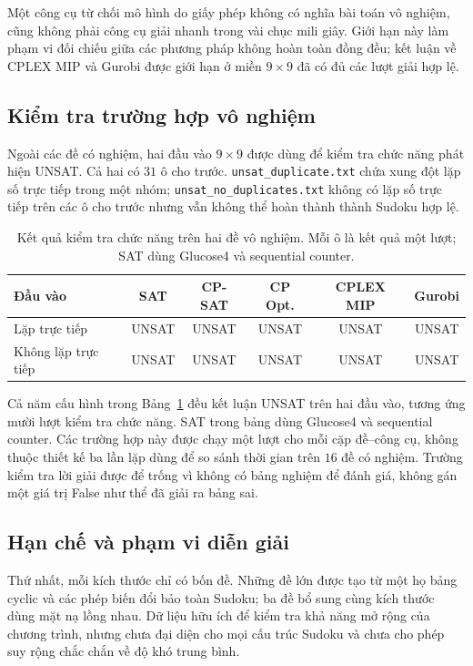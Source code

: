\documentclass[a4paper,fleqn]{cas-sc}
\begin{document}
Một công cụ từ chối mô hình do giấy phép không có nghĩa bài toán vô
nghiệm, cũng không phải công cụ giải nhanh trong vài chục mili giây.
Giới hạn này làm phạm vi đối chiếu giữa các phương pháp không hoàn
toàn đồng đều; kết luận về CPLEX MIP và Gurobi được giới hạn ở miền
$9\times9$ đã có đủ các lượt giải hợp lệ.

\subsection{Kiểm tra trường hợp vô nghiệm}

Ngoài các đề có nghiệm, hai đầu vào $9\times9$ được dùng để kiểm tra
chức năng phát hiện UNSAT. Cả hai có $31$ ô cho trước.
\texttt{unsat\_duplicate.txt} chứa xung đột lặp số trực tiếp trong một
nhóm; \texttt{unsat\_no\_duplicates.txt} không có lặp số trực tiếp
trên các ô cho trước nhưng vẫn không thể hoàn thành thành Sudoku hợp lệ.

\begin{table}[pos=htbp]
 \centering
 \caption{Kết quả kiểm tra chức năng trên hai đề vô nghiệm. Mỗi ô là kết quả một lượt; SAT dùng Glucose4 và sequential counter.}
 \label{tab:exp-unsat}
 \begin{tabular}{lccccc}
  \toprule
  Đầu vào & SAT & CP-SAT & CP Opt. & CPLEX MIP & Gurobi \\
  \midrule
  Lặp trực tiếp & UNSAT & UNSAT & UNSAT & UNSAT & UNSAT \\
  Không lặp trực tiếp & UNSAT & UNSAT & UNSAT & UNSAT & UNSAT \\
  \bottomrule
 \end{tabular}
\end{table}

Cả năm cấu hình trong Bảng~\ref{tab:exp-unsat} đều kết luận UNSAT
trên hai đầu vào, tương ứng mười lượt kiểm tra chức năng.
SAT trong bảng dùng Glucose4 và sequential counter. Các trường hợp
này được chạy một lượt cho mỗi cặp đề--công cụ, không thuộc thiết kế
ba lần lặp dùng để so sánh thời gian trên $16$ đề có nghiệm.
Trường kiểm tra lời giải được để trống vì không có bảng nghiệm để
đánh giá, không gán một giá trị False như thể đã giải ra bảng sai.

\subsection{Hạn chế và phạm vi diễn giải}

Thứ nhất, mỗi kích thước chỉ có bốn đề. Những đề lớn được tạo từ một
họ bảng cyclic và các phép biến đổi bảo toàn Sudoku; ba đề bổ sung
cùng kích thước dùng mặt nạ lồng nhau. Dữ liệu hữu ích để kiểm tra khả
năng mở rộng của chương trình, nhưng chưa đại diện cho mọi cấu trúc
Sudoku và chưa cho phép suy rộng chắc chắn về độ khó trung bình.
\end{document}
